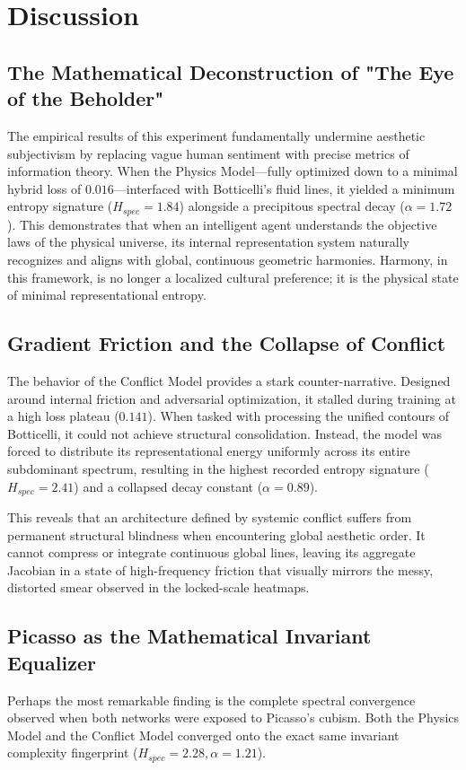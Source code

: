 \documentclass[11pt,twocolumn]{article}
\begin{document}
\section{Discussion}

\subsection{The Mathematical Deconstruction of "The Eye of the Beholder"}
The empirical results of this experiment fundamentally undermine aesthetic subjectivism by replacing vague human sentiment with precise metrics of information theory. When the Physics Model---fully optimized down to a minimal hybrid loss of $0.016$---interfaced with Botticelli's fluid lines, it yielded a minimum entropy signature ($H_{spec} = 1.84$) alongside a precipitous spectral decay ($\alpha = 1.72$). This demonstrates that when an intelligent agent understands the objective laws of the physical universe, its internal representation system naturally recognizes and aligns with global, continuous geometric harmonies. Harmony, in this framework, is no longer a localized cultural preference; it is the physical state of minimal representational entropy.

\subsection{Gradient Friction and the Collapse of Conflict}
The behavior of the Conflict Model provides a stark counter-narrative. Designed around internal friction and adversarial optimization, it stalled during training at a high loss plateau ($0.141$). When tasked with processing the unified contours of Botticelli, it could not achieve structural consolidation. Instead, the model was forced to distribute its representational energy uniformly across its entire subdominant spectrum, resulting in the highest recorded entropy signature ($H_{spec} = 2.41$) and a collapsed decay constant ($\alpha = 0.89$). 

This reveals that an architecture defined by systemic conflict suffers from permanent structural blindness when encountering global aesthetic order. It cannot compress or integrate continuous global lines, leaving its aggregate Jacobian in a state of high-frequency friction that visually mirrors the messy, distorted smear observed in the locked-scale heatmaps.

\subsection{Picasso as the Mathematical Invariant Equalizer}
Perhaps the most remarkable finding is the complete spectral convergence observed when both networks were exposed to Picasso’s cubism. Both the Physics Model and the Conflict Model converged onto the exact same invariant complexity fingerprint ($H_{spec} = 2.28, \alpha = 1.21$). 
\end{document}
